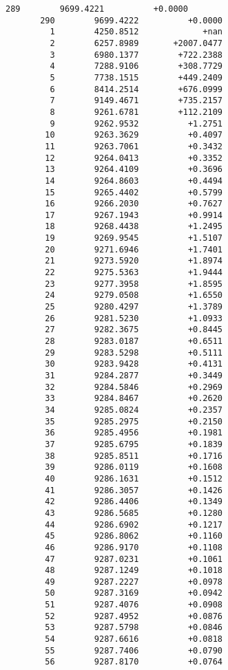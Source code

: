 \documentclass[11pt]{article}
\begin{document}
\begin{Verbatim}[commandchars=\\\{\}]
       289        9699.4221          +0.0000
       290        9699.4222          +0.0000
         1        4250.8512             +nan
         2        6257.8989       +2007.0477
         3        6980.1377        +722.2388
         4        7288.9106        +308.7729
         5        7738.1515        +449.2409
         6        8414.2514        +676.0999
         7        9149.4671        +735.2157
         8        9261.6781        +112.2109
         9        9262.9532          +1.2751
        10        9263.3629          +0.4097
        11        9263.7061          +0.3432
        12        9264.0413          +0.3352
        13        9264.4109          +0.3696
        14        9264.8603          +0.4494
        15        9265.4402          +0.5799
        16        9266.2030          +0.7627
        17        9267.1943          +0.9914
        18        9268.4438          +1.2495
        19        9269.9545          +1.5107
        20        9271.6946          +1.7401
        21        9273.5920          +1.8974
        22        9275.5363          +1.9444
        23        9277.3958          +1.8595
        24        9279.0508          +1.6550
        25        9280.4297          +1.3789
        26        9281.5230          +1.0933
        27        9282.3675          +0.8445
        28        9283.0187          +0.6511
        29        9283.5298          +0.5111
        30        9283.9428          +0.4131
        31        9284.2877          +0.3449
        32        9284.5846          +0.2969
        33        9284.8467          +0.2620
        34        9285.0824          +0.2357
        35        9285.2975          +0.2150
        36        9285.4956          +0.1981
        37        9285.6795          +0.1839
        38        9285.8511          +0.1716
        39        9286.0119          +0.1608
        40        9286.1631          +0.1512
        41        9286.3057          +0.1426
        42        9286.4406          +0.1349
        43        9286.5685          +0.1280
        44        9286.6902          +0.1217
        45        9286.8062          +0.1160
        46        9286.9170          +0.1108
        47        9287.0231          +0.1061
        48        9287.1249          +0.1018
        49        9287.2227          +0.0978
        50        9287.3169          +0.0942
        51        9287.4076          +0.0908
        52        9287.4952          +0.0876
        53        9287.5798          +0.0846
        54        9287.6616          +0.0818
        55        9287.7406          +0.0790
        56        9287.8170          +0.0764

\end{Verbatim}
\end{document}

